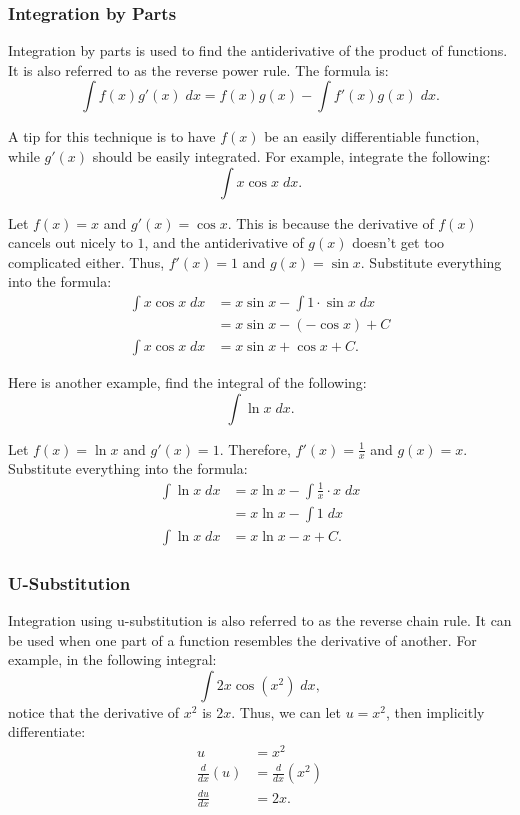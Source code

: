 \documentclass[12pt]{article}
\begin{document}
\subsubsection{Integration by Parts}
Integration by parts is used to find the antiderivative of the product of functions. It is also referred to as the reverse power rule. The formula is:
\[ \int f(x) g'(x) \; dx = f(x) g(x) - \int f'(x) g(x) \; dx. \]

A tip for this technique is to have $f(x)$ be an easily differentiable function, while $g'(x)$ should be easily integrated. For example, integrate the following:
\[ \int x \cos x \; dx. \]

\noindent Let $f(x) = x$ and $g'(x) = \cos x$. This is because the derivative of $f(x)$ cancels out nicely to $1$, and the antiderivative of $g(x)$ doesn't get too complicated either. Thus, $f'(x) = 1$ and $g(x) = \sin x$. Substitute everything into the formula:
\begin{align*}
	\int x \cos x \; dx &= x \sin x - \int 1 \cdot \sin x \; dx \\[5pt]
	&= x \sin x - (-\cos x) + C \\
	\int x \cos x \; dx &= x \sin x + \cos x + C.
\end{align*}

\noindent Here is another example, find the integral of the following:
\[ \int \ln x \; dx. \]

\noindent Let $f(x) = \ln x$ and $g'(x) = 1$. Therefore, $f'(x) = \frac{1}{x}$ and $g(x) = x$. Substitute everything into the formula:
\begin{align*}
	\int \ln x \; dx &= x \ln x - \int \frac{1}{x} \cdot x \; dx \\[5pt]
	&= x \ln x - \int 1 \; dx \\[5pt]
	\int \ln x \; dx &= x \ln x - x + C.
\end{align*}

\subsubsection{U-Substitution}
Integration using u-substitution is also referred to as the reverse chain rule. It can be used when one part of a function resembles the derivative of another. For example, in the following integral:
\[ \int 2x \cos (x^2) \; dx, \]
notice that the derivative of $x^2$ is $2x$. Thus, we can let $u = x^2$, then implicitly differentiate:
\begin{align*}
	u &= x^2 \\
	\frac{d}{dx} (u) &= \frac{d}{dx} (x^2) \\[5pt]
	\frac{du}{dx} &= 2x.
\end{align*}
\end{document}
